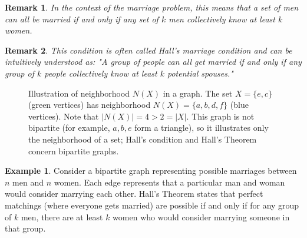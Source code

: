 \documentclass{article}
\newtheorem{remark}{Remark}
\theoremstyle{definition}
\newtheorem{example}{Example}
\begin{document}
\begin{remark}
In the context of the marriage problem, this means that a set of men can all be married if and only if any set of $k$ men collectively know at least $k$ women.
\end{remark}

\begin{remark}
This condition is often called \emph{Hall's marriage condition} and can be intuitively understood as: "A group of people can all get married if and only if any group of $k$ people collectively know at least $k$ potential spouses."
\end{remark}

\begin{figure}[h]
\centering
{}
\caption{Illustration of neighborhood $N(X)$ in a graph. The set $X = \{e, c\}$ (green vertices) has neighborhood $N(X) = \{a, b, d, f\}$ (blue vertices). Note that $|N(X)| = 4 > 2 = |X|$. This graph is not bipartite (for example, $a, b, e$ form a triangle), so it illustrates only the neighborhood of a set; Hall's condition and Hall's Theorem concern bipartite graphs.}
\label{fig:neighborhood-nx}
\end{figure}

\begin{example}
Consider a bipartite graph representing possible marriages between $n$ men and $n$ women. Each edge represents that a particular man and woman would consider marrying each other. Hall's Theorem states that perfect matchings (where everyone gets married) are possible if and only if for any group of $k$ men, there are at least $k$ women who would consider marrying someone in that group.
\end{example}
\end{document}
